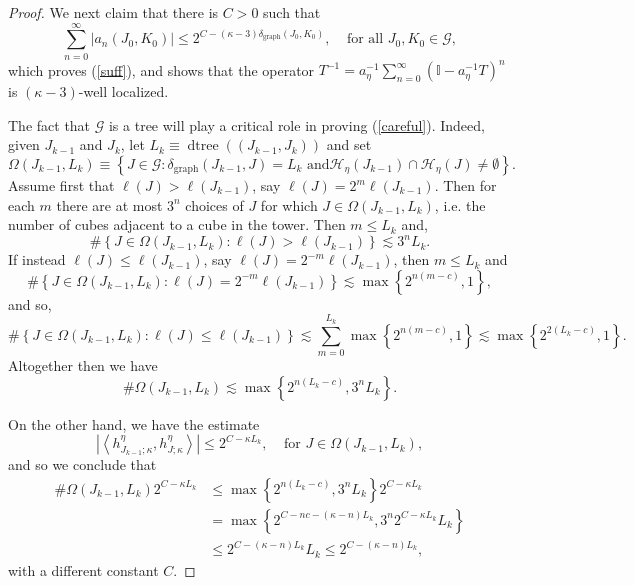 \documentclass{amsart}%
\theoremstyle{plain}
\numberwithin{equation}{section}
\begin{document}
\begin{proof}
We next claim that there is $C>0$ such that
\begin{equation}
\sum_{n=0}^{\infty}\left\vert a_{n}\left(  J_{0},K_{0}\right)  \right\vert
\leq2^{C-\left(  \kappa-3\right)  \delta_{\operatorname*{graph}}\left(
J_{0},K_{0}\right)  },\ \ \ \ \ \text{for all }J_{0},K_{0}\in\mathcal{G}%
,\label{careful}%
\end{equation}
which proves (\ref{suff}), and shows that the operator $T^{-1}=a_{\eta}%
^{-1}\sum_{n=0}^{\infty}\left(  \mathbb{I}-a_{\eta}^{-1}T\right)  ^{n}$ is
$\left(  \kappa-3\right)  $-well localized.

The fact that $\mathcal{G}$ is a tree will play a critical role in proving
(\ref{careful}). Indeed, given $J_{k-1}$ and $J_{k}$, let $L_{k}%
\equiv\operatorname*{dtree}\left(  \left(  J_{k-1},J_{k}\right)  \right)  $
and set%
\[
\Omega\left(  J_{k-1},L_{k}\right)  \equiv\left\{  J\in\mathcal{G}%
:\delta_{\operatorname*{graph}}\left(  J_{k-1},J\right)  =L_{k}\text{ and
}\mathcal{H}_{\eta}\left(  J_{k-1}\right)  \cap\mathcal{H}_{\eta}\left(
J\right)  \neq\emptyset\right\}  .
\]
Assume first that $\ell\left(  J\right)  >\ell\left(  J_{k-1}\right)  $, say
$\ell\left(  J\right)  =2^{m}\ell\left(  J_{k-1}\right)  $. Then for each $m$
there are at most $3^{n}$ choices of $J$ for which $J\in\Omega\left(
J_{k-1},L_{k}\right)  $, i.e. the number of cubes adjacent to a cube in the
tower. Then $m\leq L_{k}$ and,%
\[
\#\left\{  J\in\Omega\left(  J_{k-1},L_{k}\right)  :\ell\left(  J\right)
>\ell\left(  J_{k-1}\right)  \right\}  \lesssim3^{n}L_{k}.
\]
If instead $\ell\left(  J\right)  \leq\ell\left(  J_{k-1}\right)  $, say
$\ell\left(  J\right)  =2^{-m}\ell\left(  J_{k-1}\right)  $, then $m\leq
L_{k}$ and
\[
\#\left\{  J\in\Omega\left(  J_{k-1},L_{k}\right)  :\ell\left(  J\right)
=2^{-m}\ell\left(  J_{k-1}\right)  \right\}  \lesssim\max\left\{  2^{n\left(
m-c\right)  },1\right\}  ,
\]
and so,%
\[
\#\left\{  J\in\Omega\left(  J_{k-1},L_{k}\right)  :\ell\left(  J\right)
\leq\ell\left(  J_{k-1}\right)  \right\}  \lesssim\sum_{m=0}^{L_{k}}%
\max\left\{  2^{n\left(  m-c\right)  },1\right\}  \lesssim\max\left\{
2^{2\left(  L_{k}-c\right)  },1\right\}  .
\]
Altogether then we have%
\[
\#\Omega\left(  J_{k-1},L_{k}\right)  \lesssim\max\left\{  2^{n\left(
L_{k}-c\right)  },3^{n}L_{k}\right\}  .
\]


On the other hand, we have the estimate%
\[
\left\vert \left\langle h_{J_{k-1};\kappa}^{\eta},h_{J;\kappa}^{\eta
}\right\rangle \right\vert \leq2^{C-\kappa L_{k}},\ \ \ \ \ \text{for }%
J\in\Omega\left(  J_{k-1},L_{k}\right)  ,
\]
and so we conclude that
\begin{align*}
\#\Omega\left(  J_{k-1},L_{k}\right)  2^{C-\kappa L_{k}}  & \leq\max\left\{
2^{n\left(  L_{k}-c\right)  },3^{n}L_{k}\right\}  2^{C-\kappa L_{k}}\\
& =\max\left\{  2^{C-nc-\left(  \kappa-n\right)  L_{k}},3^{n}2^{C-\kappa
L_{k}}L_{k}\right\}  \\
& \leq2^{C-\left(  \kappa-n\right)  L_{k}}L_{k}\leq2^{C-\left(  \kappa
-n\right)  L_{k}},
\end{align*}
with a different constant $C$.


\end{proof}
\end{document}
